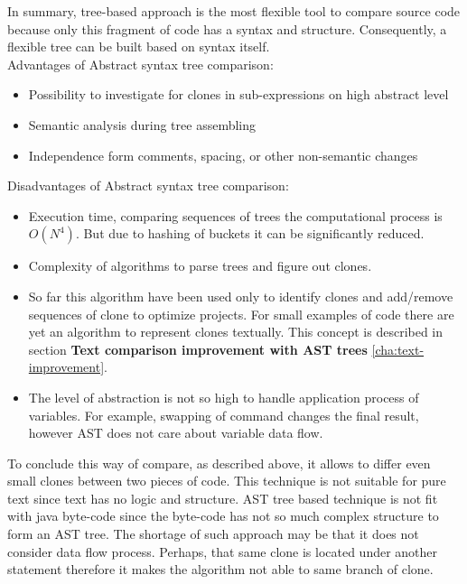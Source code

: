 \documentclass{report}
\begin{document}
In summary, tree-based approach is the most flexible tool to compare source code because only this fragment of code has a syntax and structure. Consequently, a flexible tree can be built based on syntax itself. \\
Advantages of Abstract syntax tree comparison:
\begin{itemize}
	\item Possibility to investigate for clones in sub-expressions on high abstract level
	\item Semantic analysis during tree assembling 
	\item Independence form comments, spacing, or other non-semantic changes
\end{itemize}
Disadvantages of Abstract syntax tree comparison:
\begin{itemize}
	\item Execution time, comparing sequences of trees the computational process is $O(N^4)$. But due to hashing of buckets it can be significantly reduced.
	\item Complexity of algorithms to parse trees and figure out clones.
	\item So far this algorithm have been used only to identify clones and add/remove sequences of clone to optimize projects. For small examples of code there are yet an algorithm to represent clones textually. This concept is described in section \textbf{Text comparison improvement with AST trees} \ref{cha:text-improvement}.
	\item The level of abstraction is not so high to handle application process of variables. For example, swapping of command changes the final result, however AST does not care about variable data flow.
\end{itemize}
To conclude this way of compare, as described above, it allows to differ even small clones between two pieces of code. This technique is not suitable for pure text since text has no logic and structure. AST tree based technique is not fit with java byte-code since the byte-code has not so much complex structure to form an AST tree. The shortage of such approach may be that it does not consider data flow process. Perhaps, that same clone is located under another statement therefore it makes the algorithm not able to same branch of clone.
\end{document}
